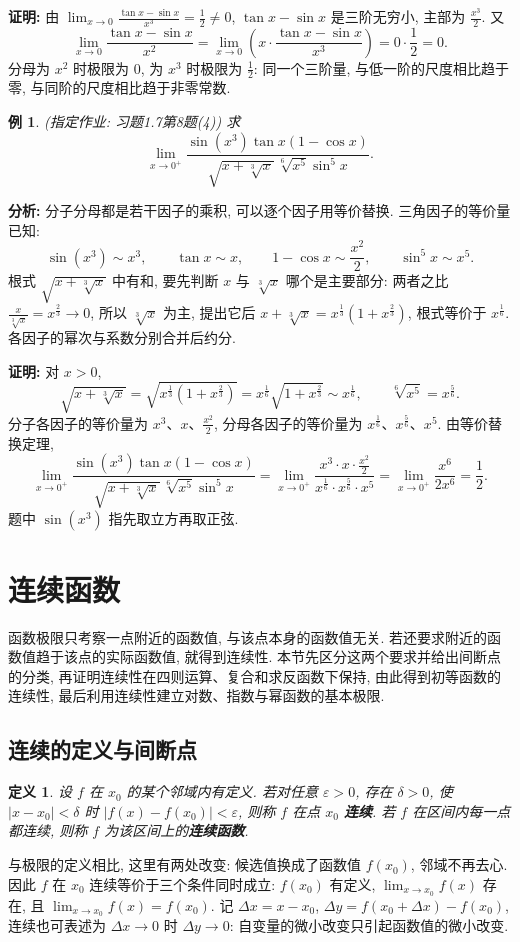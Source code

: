 \documentclass[UTF8,openany]{ctexbook}
\theoremstyle{chinesetextbook}
\newtheorem{definition}{定义}[section]
\newtheorem{example}{例}[section]
\newenvironment{cnproof}{\par\indent\textbf{证明:} \ignorespaces}{\par}
\begin{document}
\begin{cnproof}
由 $\displaystyle\lim_{x\to0}\frac{\tan x-\sin x}{x^3}=\frac12\ne0$, $\tan x-\sin x$ 是三阶无穷小, 主部为 $\displaystyle\frac{x^3}2$. 又
\[
\lim_{x\to0}\frac{\tan x-\sin x}{x^2}
=\lim_{x\to0}\left(x\cdot\frac{\tan x-\sin x}{x^3}\right)=0\cdot\frac12=0.
\]
分母为 $x^2$ 时极限为 $0$, 为 $x^3$ 时极限为 $\displaystyle\frac12$: 同一个三阶量, 与低一阶的尺度相比趋于零, 与同阶的尺度相比趋于非零常数.
\end{cnproof}
\begin{example}
\textnormal{(指定作业: 习题1.7第8题(4))} 求
\[
\lim_{x\to0^+}\frac{\sin(x^3)\tan x(1-\cos x)}{\sqrt{x+\sqrt[3]x}\,\sqrt[6]{x^5}\sin^5x}.
\]
\end{example}
\par\indent\textbf{分析:} 分子分母都是若干因子的乘积, 可以逐个因子用等价替换. 三角因子的等价量已知:
\[
\sin(x^3)\sim x^3,\qquad \tan x\sim x,\qquad 1-\cos x\sim\frac{x^2}2,\qquad \sin^5x\sim x^5.
\]
根式 $\sqrt{x+\sqrt[3]x}$ 中有和, 要先判断 $x$ 与 $\sqrt[3]x$ 哪个是主要部分: 两者之比 $\displaystyle\frac x{\sqrt[3]x}=x^{\frac23}\to0$, 所以 $\sqrt[3]x$ 为主, 提出它后 $x+\sqrt[3]x=x^{\frac13}\left(1+x^{\frac23}\right)$, 根式等价于 $x^{\frac16}$. 各因子的幂次与系数分别合并后约分.
\begin{cnproof}
对 $x>0$,
\[
\sqrt{x+\sqrt[3]x}=\sqrt{x^{\frac13}\left(1+x^{\frac23}\right)}=x^{\frac16}\sqrt{1+x^{\frac23}}\sim x^{\frac16},
\qquad
\sqrt[6]{x^5}=x^{\frac56}.
\]
分子各因子的等价量为 $x^3$、$x$、$\displaystyle\frac{x^2}2$, 分母各因子的等价量为 $x^{\frac16}$、$x^{\frac56}$、$x^5$. 由等价替换定理,
\[
\lim_{x\to0^+}\frac{\sin(x^3)\tan x(1-\cos x)}{\sqrt{x+\sqrt[3]x}\,\sqrt[6]{x^5}\sin^5x}
=\lim_{x\to0^+}\frac{x^3\cdot x\cdot\frac{x^2}2}{x^{\frac16}\cdot x^{\frac56}\cdot x^5}
=\lim_{x\to0^+}\frac{x^6}{2x^6}=\frac12.
\]
题中 $\sin(x^3)$ 指先取立方再取正弦.
\end{cnproof}

\section{连续函数}
函数极限只考察一点附近的函数值, 与该点本身的函数值无关. 若还要求附近的函数值趋于该点的实际函数值, 就得到连续性. 本节先区分这两个要求并给出间断点的分类, 再证明连续性在四则运算、复合和求反函数下保持, 由此得到初等函数的连续性, 最后利用连续性建立对数、指数与幂函数的基本极限.
\subsection{连续的定义与间断点}
\begin{definition}
设 $f$ 在 $x_0$ 的某个邻域内有定义. 若对任意 $\varepsilon>0$, 存在 $\delta>0$, 使 $|x-x_0|<\delta$ 时 $|f(x)-f(x_0)|<\varepsilon$, 则称 $f$ 在点 $x_0$ \textbf{连续}. 若 $f$ 在区间内每一点都连续, 则称 $f$ 为该区间上的\textbf{连续函数}.
\end{definition}
与极限的定义相比, 这里有两处改变: 候选值换成了函数值 $f(x_0)$, 邻域不再去心. 因此 $f$ 在 $x_0$ 连续等价于三个条件同时成立: $f(x_0)$ 有定义, $\displaystyle\lim_{x\to x_0}f(x)$ 存在, 且 $\displaystyle\lim_{x\to x_0}f(x)=f(x_0)$. 记 $\Delta x=x-x_0$, $\Delta y=f(x_0+\Delta x)-f(x_0)$, 连续也可表述为 $\Delta x\to0$ 时 $\Delta y\to0$: 自变量的微小改变只引起函数值的微小改变.
\end{document}
